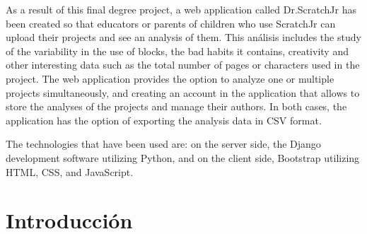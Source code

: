 \documentclass[a4paper, 12pt]{book}
\begin{document}
\vspace{5mm}

As a result of this final degree project, a web application called Dr.ScratchJr has been created so that educators or parents of children who use ScratchJr can upload their projects and see an analysis of them.
This análisis includes the study of the variability in the use of blocks, the bad habits it contains, creativity and other interesting data such as the total number of pages or characters used in the project.
The web application provides the option to analyze one or multiple projects simultaneously, and creating an account in the application that allows to store the analyses of the projects and manage their authors. In both cases, the application has the option of exporting the analysis data in CSV format.

\vspace{5mm}

The technologies that have been used are: on the server side, the Django development software utilizing Python, and on the client side, Bootstrap utilizing HTML, CSS, and JavaScript.




\tableofcontents 
\cleardoublepage
\listoffigures %



\cleardoublepage
\chapter{Introducción}
\label{chap:intro} %
\end{document}

